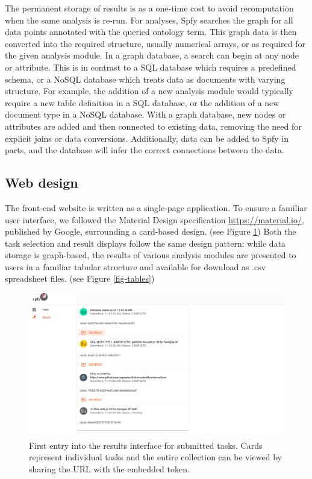 \documentclass{article}
\begin{document}
The permanent storage of results is as a one-time cost to avoid recomputation when the same analysis is re-run. For analyses, Spfy searches the graph for all data points annotated with the queried ontology term. This graph data is then converted into the required structure, usually numerical arrays, or as required for the given analysis module.
In a graph database, a search can begin at any node or attribute. This is in contrast to a SQL database which requires a predefined schema, or a NoSQL database which treats data as documents with varying structure.
For example, the addition of a new analysis module would typically require a new table definition in a SQL database, or the addition of a new document type in a NoSQL database. With a graph database, new nodes or attributes are added and then connected to existing data, removing the need for explicit joins or data conversions. Additionally, data can be added to Spfy in parts, and the database will infer the correct connections between the data.

\subsection{Web design}

The front-end website is written as a single-page application.
To ensure a familiar user interface, we followed the Material Design specification \url{https://material.io/}, published by Google, surrounding a card-based design.
(see Figure \ref{fig-results})
Both the task selection and result displays follow the same design pattern: while data storage is graph-based, the results of various analysis modules are presented to users in a familiar tabular structure and available for download as .csv spreadsheet files.
(see Figure \ref{fig-tables})

\begin{figure}[!hb]
\begin{center}
\includegraphics[width=\textwidth]{images/results.png}
\end{center}
\caption{First entry into the results interface for submitted tasks. Cards represent individual tasks and the entire collection can be viewed by sharing the URL with the embedded token.}
\label{fig-results}
\end{figure}
\end{document}
